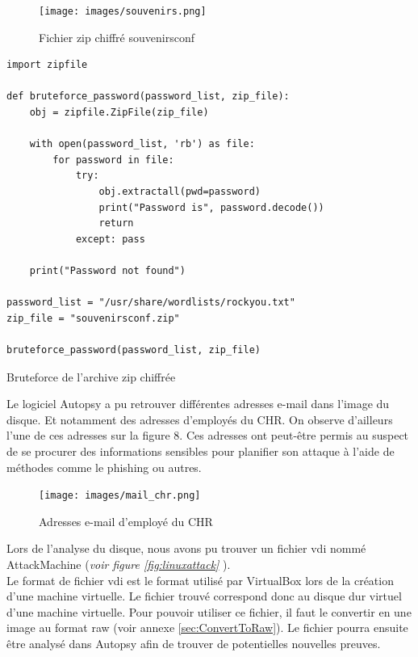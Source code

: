 \documentclass[a4paper]{article}
\newenvironment{code}{\captionsetup{type=listing}}{}
\begin{document}
\begin{figure}[H]
    \centering
    \texttt{[image: images/souvenirs.png]}
    \caption{Fichier zip chiffré souvenirsconf}
    \label{fig:Fichier_souvenirsconf}
\end{figure}

\begin{code}\small
\begin{verbatim}
import zipfile

def bruteforce_password(password_list, zip_file):
    obj = zipfile.ZipFile(zip_file)

    with open(password_list, 'rb') as file:
        for password in file:
            try:
                obj.extractall(pwd=password)
                print("Password is", password.decode())
                return
            except: pass

    print("Password not found")

password_list = "/usr/share/wordlists/rockyou.txt"
zip_file = "souvenirsconf.zip"

bruteforce_password(password_list, zip_file)
\end{verbatim}
\caption{Bruteforce de l'archive zip chiffrée}
\label{code:bruteforce}
\end{code}

Le logiciel Autopsy a pu retrouver différentes adresses e-mail dans l'image du disque. Et notamment des adresses d'employés du CHR. On observe d'ailleurs l'une de ces adresses sur la figure 8. Ces adresses ont peut-être permis au suspect de se procurer des informations sensibles pour planifier son attaque à l'aide de méthodes comme le phishing ou autres.

\begin{figure}[H]
    \centering
    \texttt{[image: images/mail\_chr.png]}
    \caption{Adresses e-mail d'employé du CHR}
    \label{fig:mail-chr}
\end{figure}

Lors de l'analyse du disque, nous avons pu trouver un fichier vdi nommé AttackMachine (\emph{voir figure \ref{fig:linuxattack}} ). \\
Le format de fichier vdi est le format utilisé par VirtualBox lors de la création d'une machine virtuelle. Le fichier trouvé correspond donc au disque dur virtuel d'une machine virtuelle. Pour pouvoir utiliser ce fichier, il faut le convertir en une image au format raw (voir annexe \ref{sec:ConvertToRaw}). Le fichier pourra ensuite être analysé dans Autopsy afin de trouver de potentielles nouvelles preuves.
\end{document}
